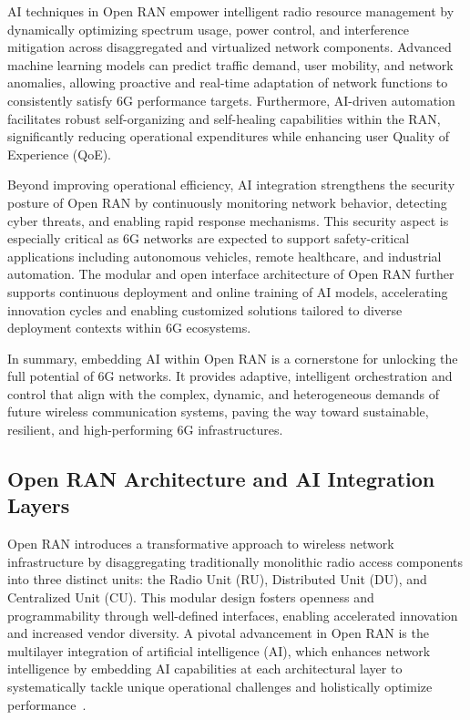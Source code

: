 \documentclass[sigconf]{acmart}
\begin{document}
AI techniques in Open RAN empower intelligent radio resource management by dynamically optimizing spectrum usage, power control, and interference mitigation across disaggregated and virtualized network components. Advanced machine learning models can predict traffic demand, user mobility, and network anomalies, allowing proactive and real-time adaptation of network functions to consistently satisfy 6G performance targets. Furthermore, AI-driven automation facilitates robust self-organizing and self-healing capabilities within the RAN, significantly reducing operational expenditures while enhancing user Quality of Experience (QoE).

Beyond improving operational efficiency, AI integration strengthens the security posture of Open RAN by continuously monitoring network behavior, detecting cyber threats, and enabling rapid response mechanisms. This security aspect is especially critical as 6G networks are expected to support safety-critical applications including autonomous vehicles, remote healthcare, and industrial automation. The modular and open interface architecture of Open RAN further supports continuous deployment and online training of AI models, accelerating innovation cycles and enabling customized solutions tailored to diverse deployment contexts within 6G ecosystems.

In summary, embedding AI within Open RAN is a cornerstone for unlocking the full potential of 6G networks. It provides adaptive, intelligent orchestration and control that align with the complex, dynamic, and heterogeneous demands of future wireless communication systems, paving the way toward sustainable, resilient, and high-performing 6G infrastructures.

\subsection{Open RAN Architecture and AI Integration Layers}

Open RAN introduces a transformative approach to wireless network infrastructure by disaggregating traditionally monolithic radio access components into three distinct units: the Radio Unit (RU), Distributed Unit (DU), and Centralized Unit (CU). This modular design fosters openness and programmability through well-defined interfaces, enabling accelerated innovation and increased vendor diversity. A pivotal advancement in Open RAN is the multilayer integration of artificial intelligence (AI), which enhances network intelligence by embedding AI capabilities at each architectural layer to systematically tackle unique operational challenges and holistically optimize performance~\cite{ref54}.
\end{document}
